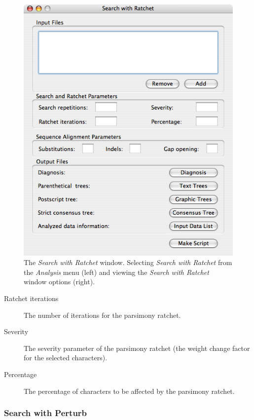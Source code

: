 \begin{figure}
\begin{minipage}[c]{0.48\textwidth}
	   	\includegraphics[width=\textwidth]{figures/searchwithratchet_window.jpg}
   	\end{minipage}
	
\caption{The \emph{Search with Ratchet} window. Selecting \emph{Search with Ratchet} from the \emph{Analysis} menu (left) and viewing the \emph{Search with Ratchet} window options (right).}
\label{fig:search_with_ratchet_window}
\end{figure}

\begin{description}
    \item[Ratchet iterations] The number of iterations for the parsimony
        ratchet.
    \item[Severity] The severity parameter of the parsimony ratchet (the weight
        change factor for the selected characters).
    \item[Percentage] The percentage of characters to be affected by the
        parsimony ratchet.
\end{description}

\subsubsection{Search with Perturb}

